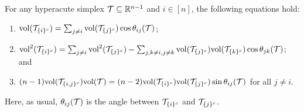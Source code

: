 \begin{lemma}
	\label{lem:volT_multi}
	For any hyperacute simplex $\mathcal{T}\subseteq\mathbb{R}^{n-1}$ and  $i\in[n]$, the following equations hold:
	\begin{enumerate}
		\item $\textnormal{vol}(\mathcal{T}_{\{i\}^c}) = \sum_{j\neq i}\textnormal{vol}(\mathcal{T}_{\{j\}^c})\cos\theta_{ij}(\mathcal{T})$;
		\item $\textnormal{vol}^2(\mathcal{T}_{\{i\}^c}) =  \sum_{j\neq i}\textnormal{vol}^2(\mathcal{T}_{\{j\}^c}) - \sum_{j,k\neq i,j\neq k} \textnormal{vol}(\mathcal{T}_{\{j\}^c})\textnormal{vol}(\mathcal{T}_{\{k\}^c})\cos\theta_{jk}(\mathcal{T})$; and
		\item $(n-1)\textnormal{vol}(\mathcal{T}_{\{i,j\}^c})\textnormal{vol}(\mathcal{T}) = (n-2)\textnormal{vol}(\mathcal{T}_{\{i\}^c})\textnormal{vol}(\mathcal{T}_{\{j\}^c})\sin\theta_{ij}(\mathcal{T})$ for  all $j\neq i$. 
	\end{enumerate}
	Here, as usual, $\theta_{ij}(\mathcal{T})$ is the angle between $\mathcal{T}_{\{i\}^c}$ and $\mathcal{T}_{\{j\}^c}$. 
\end{lemma}

